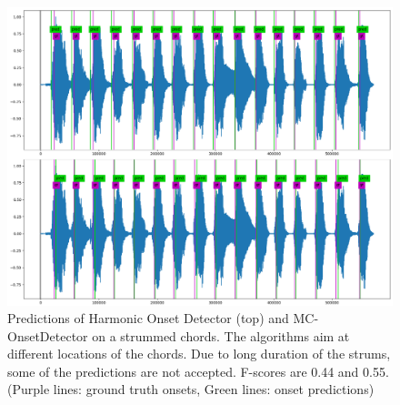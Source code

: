 \begin{figure}
    \centering
    \includegraphics[width=\columnwidth]{discussion/hodmcod215.png}
    \caption{Predictions of Harmonic Onset Detector (top) and MC-OnsetDetector on a strummed chords. The algorithms aim at different locations of the chords. Due to long duration of the strums, some of the predictions are not accepted. F-scores are 0.44 and 0.55. (Purple lines: ground truth onsets, Green lines: onset predictions)}
    \label{fig:hodmcod215}
\end{figure}

\newpage



